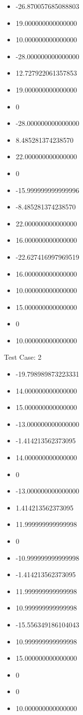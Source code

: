 \documentclass[]{article}
\providecommand{\tightlist}{%
  \setlength{\itemsep}{0pt}\setlength{\parskip}{0pt}}
\begin{document}
\begin{itemize}
\tightlist
\item
  -26.870057685088803
\item
  19.000000000000000
\item
  10.000000000000000
\item
  -28.000000000000000
\item
  12.727922061357853
\item
  19.000000000000000
\item
  0
\item
  -28.000000000000000
\item
  8.485281374238570
\item
  22.000000000000000
\item
  0
\item
  -15.999999999999996
\item
  -8.485281374238570
\item
  22.000000000000000
\item
  16.000000000000000
\item
  -22.627416997969519
\item
  16.000000000000000
\item
  10.000000000000000
\item
  15.000000000000000
\item
  0
\item
  10.000000000000000
\end{itemize}

Test Case: 2

\begin{itemize}
\tightlist
\item
  -19.798989873223331
\item
  14.000000000000000
\item
  15.000000000000000
\item
  -13.000000000000000
\item
  -1.414213562373095
\item
  14.000000000000000
\item
  0
\item
  -13.000000000000000
\item
  1.414213562373095
\item
  11.999999999999998
\item
  0
\item
  -10.999999999999998
\item
  -1.414213562373095
\item
  11.999999999999998
\item
  10.999999999999998
\item
  -15.556349186104043
\item
  10.999999999999998
\item
  15.000000000000000
\item
  0
\item
  0
\item
  10.000000000000000
\end{itemize}
\end{document}
